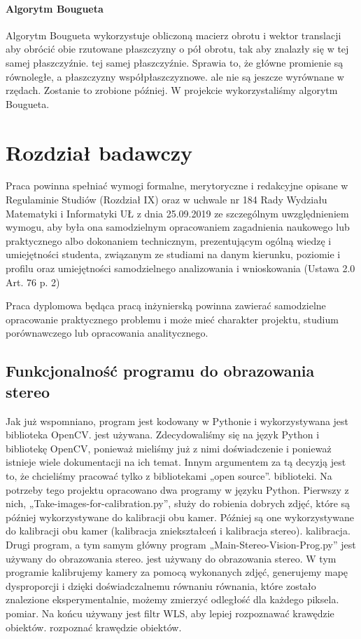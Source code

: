 \documentclass[magisterska]{pracadypl}
\begin{document}
\subsubsection{Algorytm Bougueta}

Algorytm Bougueta wykorzystuje obliczoną macierz obrotu i wektor translacji
aby obrócić obie rzutowane płaszczyzny o pół obrotu, tak aby znalazły się w tej samej płaszczyźnie.
tej samej płaszczyźnie. Sprawia to, że główne promienie są równoległe, a płaszczyzny współpłaszczyznowe.
ale nie są jeszcze wyrównane w rzędach. Zostanie to zrobione później.
W projekcie wykorzystaliśmy algorytm Bougueta.

\chapter{Rozdział badawczy}

Praca powinna spełniać wymogi formalne, merytoryczne i redakcyjne opisane w Regulaminie  Studiów (Rozdział IX) oraz w uchwale nr 184 Rady Wydziału Matematyki i Informatyki UŁ z dnia 25.09.2019 ze szczególnym uwzględnieniem wymogu, aby była ona samodzielnym opracowaniem zagadnienia naukowego lub praktycznego albo dokonaniem technicznym, prezentującym ogólną wiedzę i umiejętności studenta, związanym ze studiami na danym kierunku, poziomie i profilu oraz umiejętności samodzielnego analizowania i wnioskowania (Ustawa 2.0 Art. 76 p. 2)

Praca dyplomowa będąca pracą inżynierską powinna zawierać samodzielne opracowanie praktycznego problemu i może mieć charakter projektu, studium porównawczego lub opracowania analitycznego.

\section{Funkcjonalność programu do obrazowania stereo}

Jak już wspomniano, program jest kodowany w Pythonie i wykorzystywana jest biblioteka OpenCV.
jest używana. Zdecydowaliśmy się na język Python i bibliotekę OpenCV, ponieważ
mieliśmy już z nimi doświadczenie i ponieważ istnieje wiele dokumentacji na ich temat. Innym
argumentem za tą decyzją jest to, że chcieliśmy pracować tylko z bibliotekami „open source”.
biblioteki.
Na potrzeby tego projektu opracowano dwa programy w języku Python.
Pierwszy z nich, „Take-images-for-calibration.py”, służy do robienia dobrych zdjęć, które są później wykorzystywane do kalibracji obu kamer.
Później są one wykorzystywane do kalibracji obu kamer (kalibracja zniekształceń i kalibracja stereo).
kalibracja.
Drugi program, a tym samym główny program „Main-Stereo-Vision-Prog.py” jest używany do obrazowania stereo.
jest używany do obrazowania stereo. W tym programie kalibrujemy kamery za pomocą wykonanych zdjęć, generujemy mapę dysproporcji i dzięki doświadczalnemu równaniu
równania, które zostało znalezione eksperymentalnie, możemy zmierzyć odległość dla każdego piksela.
pomiar. Na końcu używany jest filtr WLS, aby lepiej rozpoznawać krawędzie obiektów.
rozpoznać krawędzie obiektów.
\end{document}
